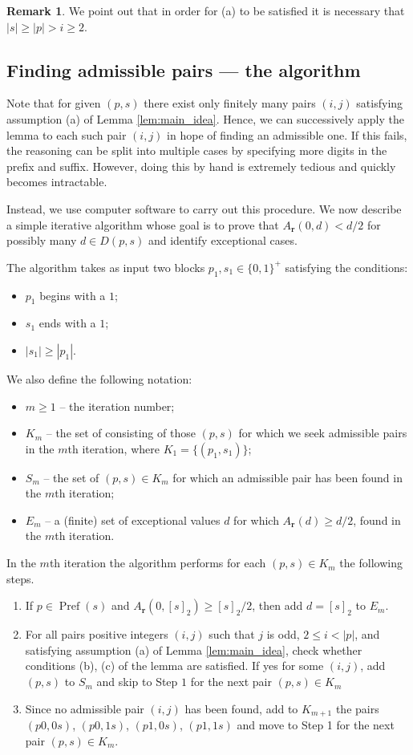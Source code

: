 \documentclass[a4paper,11pt]{amsart}
\theoremstyle{definition}
\newtheorem{rem}{Remark}
\newcommand{\Pref}{\operatorname{Pref}}
\begin{document}
\begin{rem}
    We point out that in order for (a) to be satisfied it is necessary that $|s| \geq |p| > i \geq 2$.
\end{rem}

\subsection{Finding admissible pairs --- the algorithm}

Note that for given $(p,s)$ there exist only finitely many pairs $(i,j)$ satisfying  assumption (a) of Lemma \ref{lem:main_idea}. Hence, we can successively apply the lemma to each such pair $(i,j)$ in hope of finding an admissible one. If this fails, the reasoning can be split into multiple cases by specifying more digits in the prefix and suffix. However, doing this by hand is extremely tedious and quickly becomes intractable.

Instead, we use computer software to carry out this procedure. We now describe a simple iterative algorithm whose goal is to prove that $A_{\mathbf{r}}(0,d) < d/2$ for possibly many $d \in D(p,s)$ and identify exceptional cases.

The algorithm takes as input two blocks $p_1,s_1 \in  \{0,1\}^+$ satisfying the conditions:
\begin{itemize}
\item $p_1$ begins with a $1$;
\item $s_1$ ends with a $1$;
\item $|s_1| \geq |p_1|$.
\end{itemize}
We also define the following notation:
\begin{itemize}
\item $m \geq 1$ -- the iteration number;
\item $K_m$ -- the set of consisting of those $(p,s)$ for which we seek admissible pairs in the $m$th iteration, where $K_1 = \{(p_1,s_1)\}$;
\item $S_m$ -- the set of $(p,s) \in K_m$ for which an admissible pair has been found in the $m$th iteration;
\item $E_m$ -- a (finite) set of exceptional values $d$ for which $A_{\mathbf{r}}(d) \geq d/2$, found in the $m$th iteration.
\end{itemize}
In the $m$th iteration the algorithm performs for each $(p,s) \in K_m$ the following steps.
\begin{enumerate}
\item[\textbf{Step 1.}] If $p \in \Pref(s)$ and $A_{\mathbf{r}}(0,[s]_2) \geq [s]_2/2$, then add $d = [s]_2$ to $E_m$.
\item[\textbf{Step 2.}] For all pairs positive integers $(i,j)$ such that $j$ is odd, $2 \leq i<|p|$, and satisfying assumption (a) of Lemma \ref{lem:main_idea}, check whether conditions (b), (c) of the lemma are satisfied. If yes for some $(i,j)$, add $(p,s)$ to $S_m$ and skip to Step $1$ for the next pair $(p,s) \in K_m$
\item[\textbf{Step 3.}] Since no admissible pair $(i,j)$ has been found, add to $K_{m+1}$ the pairs $(p0,0s)$, $(p0,1s)$, $(p1,0s)$, $(p1,1s)$ and move to Step 1 for the next pair $(p,s) \in K_m$.
\end{enumerate}
\end{document}
